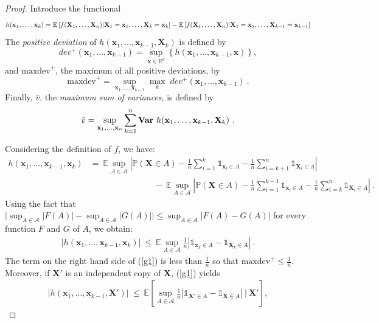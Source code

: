 \begin{proof}
Introduce the functional
\begin{align*}
h(\mathbf{x}_1,\ldots,\mathbf{x}_k) = \mathbb{E}\left [ f(\mathbf X_1,\ldots, \mathbf X_n) | \mathbf{X}_1=\mathbf{x}_1,\ldots,\mathbf{X}_k=\mathbf{x}_k \right] - \mathbb{E}\left [ f(\mathbf X_1,\ldots, \mathbf X_n) | \mathbf{X}_1=\mathbf{x}_1,\ldots,\mathbf{X}_{k-1}=\mathbf{x}_{k-1} \right]
\end{align*}
The \emph{positive deviation} of
$h(\mathbf{x}_1,\ldots,\mathbf{x}_{k-1},\mathbf{X}_k)$ is defined by 
\[dev^+(\mathbf{x}_1,\ldots,\mathbf{x}_{k-1})= \sup_{\mathbf{x} \in
  \mathbb{R}^d} \left \{
  h(\mathbf{x}_1,\ldots,\mathbf{x}_{k-1},\mathbf{x})\right \}, \]
 and $\text{maxdev}^+$, the maximum of all positive deviations, by 
 \[\text{maxdev}^+ = \sup_{\mathbf{x}_1,\ldots,\mathbf{x}_{k-1}} \max_{k}\;
 dev^+(\mathbf{x}_1,\ldots,\mathbf{x}_{k-1})~.\] %
 Finally,  $\hat v $, the \emph{maximum sum of
 variances}, is defined by $$\hat v = \sup_{\mathbf{x}_1,\ldots,\mathbf{x}_n}
 \sum_{k=1}^{n} \mathbf{Var}~ h(\mathbf{x}_1,\ldots,\mathbf{x}_{k-1}, \mathbf X_k)~.$$

Considering the definition of $f$, we have:
\begin{align*}
h(\mathbf{x}_1,\ldots,\mathbf{x}_{k-1},\mathbf{x}_k) &= ~\mathbb{E} \sup_{A \in \mathcal{A} } \left | \mathbb{P}(\mathbf{X} \in A) - \frac{1}{n} \sum_{i=1}^k \mathds{1}_{\mathbf{x}_i \in A} - \frac{1}{n} \sum_{i=k+1}^n \mathds{1}_{\mathbf{X}_i \in A}  \right|  \\ 
&~~~~~~~~~~~~~~~~~~~~~~~~~~~~~~~~~~-~ \mathbb{E} \sup_{A \in \mathcal{A} } \left | \mathbb{P}(\mathbf{X} \in A) - \frac{1}{n} \sum_{i=1}^{k-1} \mathds{1}_{\mathbf{x}_i \in A} - \frac{1}{n} \sum_{i=k}^n \mathds{1}_{\mathbf{X}_i \in A}  \right|~. 
\end{align*}
Using the fact that $\big | \sup_{A \in \mathcal{A}}|F(A)| - \sup_{A \in \mathcal{A}}|G(A)| \big| \le \sup_{A \in \mathcal{A}} |F(A) - G(A)|$ for every function $F$ and $G$ of $A$, we obtain:
\begin{align}
\label{g1}
\big| h(\mathbf{x}_1,\ldots,\mathbf{x}_{k-1},\mathbf{x}_k) \big| ~\le~ \mathbb{E}  \sup_{A \in \mathcal{A}} \frac{1}{n} \left | \mathds{1}_{\mathbf{x}_k \in A} - \mathds{1}_{\mathbf{X}_k \in A}  \right|~.
\end{align}
\noindent
The term on the right hand side of (\ref{g1}) is less than $\frac{1}{n}$ so that $\text{maxdev}^+ \le \frac{1}{n}$. Moreover, if $\mathbf{X}'$ is an independent copy of $\mathbf{X}$, (\ref{g1}) yields  
\begin{align*}
\big| h(\mathbf{x}_1,\ldots,\mathbf{x}_{k-1},\mathbf{X}') \big| ~\le~ \mathbb{E} \left [  \sup_{A \in \mathcal{A}} \frac{1}{n} \left | \mathds{1}_{\mathbf{X}' \in A} - \mathds{1}_{\mathbf{X} \in A}  \right| ~\Big|~ \mathbf{X}' \right],
\end{align*}


\end{proof}
